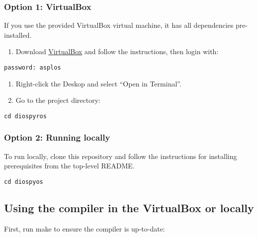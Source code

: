 \hypertarget{option-1-virtualbox}{%
\subsubsection{Option 1: VirtualBox}\label{option-1-virtualbox}}

If you use the provided VirtualBox virtual machine, it has all
dependencies pre-installed.

\begin{enumerate}
\def\labelenumi{\arabic{enumi}.}
\tightlist
\item
  Download \href{https://www.virtualbox.org/}{VirtualBox} and follow the
  instructions, then login with:
\end{enumerate}

\begin{verbatim}
password: asplos
\end{verbatim}

\begin{enumerate}
\def\labelenumi{\arabic{enumi}.}
\setcounter{enumi}{1}
\tightlist
\item
  Right-click the Deskop and select ``Open in Terminal''.
\item
  Go to the project directory:
\end{enumerate}

\begin{verbatim}
cd diospyros
\end{verbatim}

\hypertarget{option-2-running-locally}{%
\subsubsection{Option 2: Running
locally}\label{option-2-running-locally}}

To run locally, clone this repository and follow the instructions for
installing prerequisites from the top-level README.

\begin{verbatim}
cd diospyos
\end{verbatim}

\hypertarget{using-the-compiler-in-the-virtualbox-or-locally}{%
\subsection{Using the compiler in the VirtualBox or
locally}\label{using-the-compiler-in-the-virtualbox-or-locally}}

First, run make to ensure the compiler is up-to-date:

